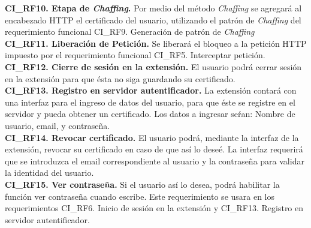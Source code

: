 \documentclass[12pt, a4paper, titlepage]{report}
\begin{document}
{				\textbf{CI\_RF10. Etapa de \textit{Chaffing}.} Por medio del m\'etodo \textit{Chaffing} se agregará al encabezado HTTP el certificado del usuario, utilizando el patrón de \textit{Chaffing} del requerimiento funcional CI\_RF9. Generación de patrón de \textit{Chaffing}\\
                    
                \textbf{CI\_RF11. Liberaci\'on de Petición.} Se liberar\'a el bloqueo a la petici\'on HTTP impuesto por el requerimiento funcional CI\_RF5. Interceptar petición.\\
                
                \textbf{CI\_RF12. Cierre de sesión en la extensión.} El usuario podrá cerrar sesión en la extensión para que ésta no siga guardando su certificado.\\
                
                \textbf{CI\_RF13. Registro en servidor autentificador.} La extensión contará con una interfaz para el ingreso de datos del usuario, para que éste se registre en el servidor y pueda obtener un certificado. Los datos a ingresar seŕan: Nombre de usuario, email, y contraseña.\\
                
                \textbf{CI\_RF14. Revocar certificado.} El usuario podrá, mediante la interfaz de la extensión, revocar su certificado en caso de que así lo deseé. La interfaz requerirá que se introduzca el email correspondiente al usuario y la contraseña para validar la identidad del usuario. \\
                
                \textbf{CI\_RF15. Ver contraseña.} Si el usuario así lo desea, podrá habilitar la función ver contraseña cuando escribe. Este requerimiento se usara en los requerimientos CI\_RF6. Inicio de sesión en la extensión y CI\_RF13. Registro en servidor autentificador.\\
                
                
		        }
				
\end{document}
